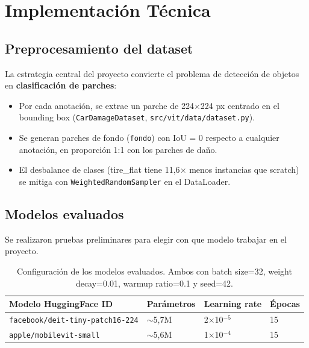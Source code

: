 \documentclass[12pt,a4paper]{article}
\begin{document}
\section{Implementación Técnica}

\subsection{Preprocesamiento del dataset}

La estrategia central del proyecto convierte el problema de detección de objetos en
\textbf{clasificación de parches}:

\begin{itemize}
  \item Por cada anotación, se extrae un parche de 224$\times$224 px centrado en el
        bounding box (\texttt{CarDamageDataset}, \texttt{src/vit/data/dataset.py}).
  \item Se generan parches de fondo (\texttt{fondo}) con IoU = 0 respecto a cualquier
        anotación, en proporción 1:1 con los parches de daño.
  \item El desbalance de clases (tire\_flat tiene 11,6$\times$ menos instancias que
        scratch) se mitiga con \texttt{WeightedRandomSampler} en el DataLoader.
\end{itemize}

\subsection{Modelos evaluados}
Se realizaron pruebas preliminares para elegir con que modelo trabajar en el proyecto.
\begin{table}[H]
  \centering
  \begin{tabular}{llll}
    \toprule
    \textbf{Modelo HuggingFace ID} & \textbf{Parámetros} &
    \textbf{Learning rate} & \textbf{Épocas} \\
    \midrule
    \texttt{facebook/deit-tiny-patch16-224} & $\sim$5,7M & 2$\times$10$^{-5}$ & 15 \\
    \texttt{apple/mobilevit-small}          & $\sim$5,6M & 1$\times$10$^{-4}$ & 15 \\
    \bottomrule
  \end{tabular}
  \caption{Configuración de los modelos evaluados. Ambos con batch size=32, weight decay=0.01,
  warmup ratio=0.1 y seed=42.}
\end{table}
\end{document}

